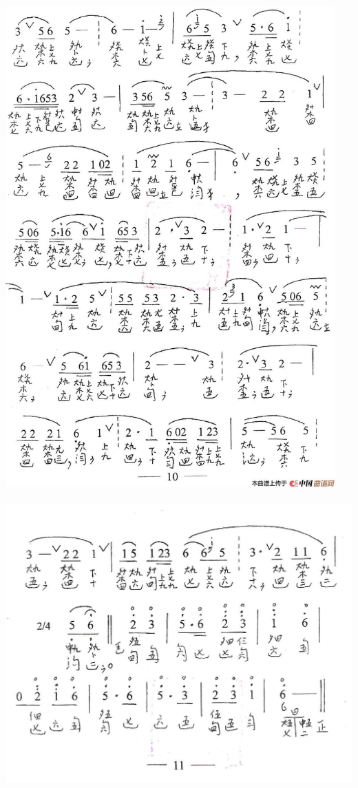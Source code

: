 \documentclass[cn,pad,twocol]{elegantbook}
\begin{document}
\paragraph*{\includegraphics[width=0.95\textwidth]{mudanting/2021-牡丹亭-10寻梦}} 
\paragraph*{\includegraphics[width=\textwidth]{mudanting/2021-牡丹亭-11寻梦}} 
\end{document}
